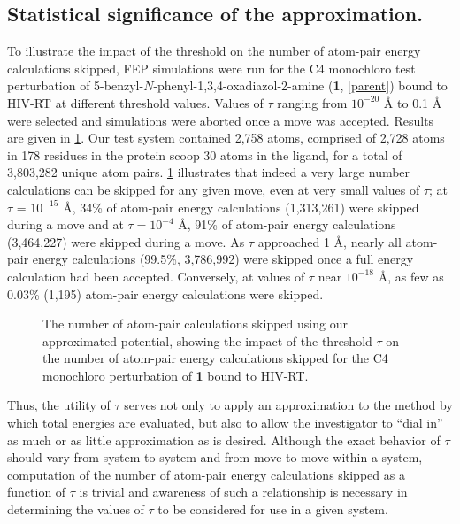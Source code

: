 \documentclass[12pt]{report}
\begin{document}

\subsection{Statistical significance of the approximation.}

To illustrate the impact of the threshold on the number of atom-pair energy calculations skipped, FEP simulations were run for the C4 monochloro test perturbation of 5-benzyl-$N$-phenyl-1,3,4-oxadiazol-2-amine (\textbf{1}, \cref{parent}) bound to HIV-RT at different threshold values. Values of $\tau$ ranging from $10^{-20}$ \AA{} to 0.1 \AA{} were selected and simulations were aborted once a move was accepted. Results are given in \cref{nskip}. Our test system contained 2,758 atoms, comprised of 2,728 atoms in 178 residues in the protein scoop 30 atoms in the ligand, for a total of 3,803,282 unique atom pairs. \cref{nskip} illustrates that indeed a very large number calculations can be skipped for any given move, even at very small values of $\tau$; at $\tau$ = $10^{-15}$ \AA, 34\% of atom-pair energy calculations (1,313,261) were skipped during a move and at $\tau = 10^{-4}$ \AA, 91\% of atom-pair energy calculations (3,464,227) were skipped during a move. As $\tau$ approached 1 \AA, nearly all atom-pair energy calculations (99.5\%, 3,786,992) were skipped once a full energy calculation had been accepted. Conversely, at values of $\tau$ near $10^{-18}$ \AA, as few as 0.03\% (1,195) atom-pair energy calculations were skipped.

\begin{figure}[t!]
\centering

\caption{The number of atom-pair calculations skipped using our approximated potential, showing the impact of the threshold $\tau$ on the number of atom-pair energy calculations skipped for the C4 monochloro perturbation of \textbf{1} bound to HIV-RT.}
\label{nskip}
\end{figure}

Thus, the utility of $\tau$ serves not only to apply an approximation to the method by which total energies are evaluated, but also to allow the investigator to ``dial in'' as much or as little approximation as is desired. Although the exact behavior of $\tau$ should vary from system to system and from move to move within a system, computation of the number of atom-pair energy calculations skipped as a function of $\tau$ is trivial and awareness of such a relationship is necessary in determining the values of $\tau$ to be considered for use in a given system.
\end{document}
